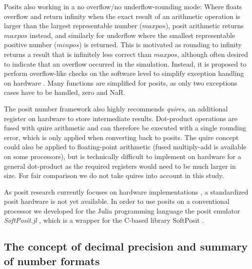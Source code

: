 \documentclass[draft]{agujournal2019}
\begin{document}
Posits also working in a no overflow/no underflow-rounding mode: Where floats overflow and return infinity when the exact result of an arithmetic operation is larger than the largest representable number ($maxpos$), posit arithmetic returns $maxpos$ instead, and similarly for underflow where the smallest representable positive number ($minpos$) is returned. This is motivated as rounding to infinity returns a result that is infinitely less correct than $maxpos$, although often desired to indicate that an overflow occurred in the simulation. Instead, it is proposed to perform overflow-like checks on the software level to simplify exception handling on hardware \cite{Gustafson2017a}. Many functions are simplified for posits, as only two exceptions cases have to be handled, zero and NaR.

The posit number framework also highly recommends \emph{quires}, an additional register on hardware to store intermediate results. Dot-product operations are fused with quire arithmetic and can therefore be executed with a single rounding error, which is only applied when converting back to posits. The quire concept could also be applied to floating-point arithmetic (fused multiply-add is available on some processors), but is technically difficult to implement on hardware for a general dot-product as the required registers would need to be much larger in size. For fair comparison we do not take quires into account in this study.

As posit research currently focuses on hardware implementations \cite{vanDam2019,Chen2018,Chaurasiya2018,Glaser2017}, a standardized posit hardware is not yet available. In order to use posits on a conventional processor we developed for the Julia programming language \cite{Bezanson2017} the posit emulator \emph{SoftPosit.jl} \cite{Klower2019a}, which is a wrapper for the C-based library SoftPosit \cite{Leong2020}.

\subsection{The concept of decimal precision and summary of number formats}
\label{sec:decprec}
\end{document}
